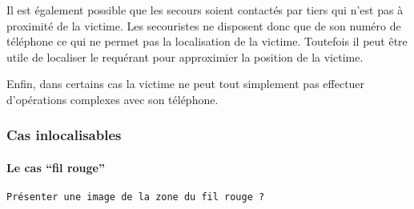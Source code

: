 Il est également possible que les secours soient contactés par tiers
qui n'est pas à proximité de la victime. Les secouristes ne disposent
donc que de son numéro de téléphone ce qui ne permet pas la
localisation de la victime. Toutefois il peut être utile de localiser
le requérant pour approximier la position de la victime.

Enfin, dans certains cas la victime ne peut tout simplement pas
effectuer d'opérations complexes avec son téléphone.


\subsubsection{Cas inlocalisables}
\label{subsec:1-1-2-2}

\paragraph{Le cas \enquote{fil rouge}}

\texttt{Présenter une image de la zone du fil rouge ?}

